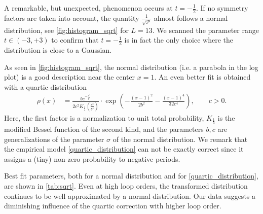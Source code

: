 \documentclass[12pt,a4paper]{article}
\newcommand{\period}{\mathcal P}
\renewcommand{\|}{\rule[-0.4ex]{0.2ex}{1.2em}}
\begin{document}
A remarkable, but unexpected, phenomenon occurs at $t=-\frac 12$.  If no symmetry factors are taken into account, the quantity   $\frac{1}{\sqrt{\period}}$ almost follows a normal distribution, see \cref{fig:histogram_sqrt} for  $L=13$. We scanned the parameter range   $t\in (-3,+3)$ to confirm that $t=-\frac 12$ is in fact the only choice where the distribution is close to a Gaussian. 




As seen  in \cref{fig:histogram_sqrt}, the normal distribution (i.e. a parabola in the log plot) is a good description near the center $x=1$. An even better fit is obtained with a quartic distribution 
\begin{align}\label{quartic_distribution}
	\rho(x) &= \frac{b e^{-\frac{c^4}{b^4}}}{2c^2 K_{\frac 14} \left( \frac{c^4}{b^4} \right)  } \cdot \exp \left( - \frac{(x-1)^2}{2b^2}  - \frac{(x-1)^4}{32 c^4} \right)  , \qquad c>0.
\end{align}
Here, the first factor is a normalization to unit total probability, $K_\frac 14$ is the modified Bessel function of the second kind, and the parameters $b,c$ are generalizations of the parameter $\sigma$ of the normal distribution. We remark that the empirical model \cref{quartic_distribution}   can not be exactly correct since it assigns a (tiny) non-zero probability to negative periods.



Best fit parameters, both for a normal distribution and for \cref{quartic_distribution}, are shown in \cref{tab:sqrt}. 
Even at high loop orders, the transformed distribution continues to be well approximated by a normal distribution. Our data suggests a diminishing influence of the quartic correction with higher loop order.
\end{document}
